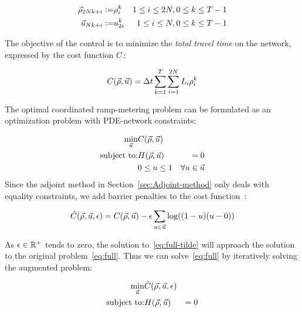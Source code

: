 							\begin{eqnarray*}
								\vec{\rho}_{2Nk+i}:= & \rho_{i}^{k} & 1\le i\le2N,0\le k\le T-1\\
								\vec{u}_{Nk+i}:= & u_{2i}^{k} & 1\le i\le N,0\le k\le T-1
							\end{eqnarray*}
														
														
							The objective of the control is to minimize the \emph{total travel
								time }on the network, expressed by the cost function $C$:
														
							\[
								\cost\left(\state,\control\right)=\Delta t\sum_{k=1}^{T}\sum_{i=1}^{2\nlinks}L_{i}\densitydiscrete{\link}{\tind}
							\]
														
														
							The optimal coordinated ramp-metering problem can be formulated as
							an optimization problem with PDE-network constraints:
														
							\begin{eqnarray}
								\min_{\control} & \cost\left(\state,\control\right)\label{eq:full}\\
								\text{subject to:} & \sys\left(\state,\control\right) & =0\nonumber \\
								& 0\le\convar\le1 & \forall\convar\in\control\nonumber 
							\end{eqnarray}
							Since the adjoint method in Section~\ref{sec:Adjoint-method} only
							deals with equality constraints, we add barrier penalties to the cost
							function~\cite{Boyd2010,Bayen2006}:
														
							\begin{equation}
								\tilde{\cost}\left(\state,\control,\epsilon\right)=\cost\left(\state,\control\right)-\barrierTerm\sum_{\convar\in\control}\log\left(\left(1-\convar\right)\left(\convar-0\right)\right)\label{eq:full-tilde}
							\end{equation}
														
														
							As $\epsilon\in\mathbb{R}^{+}$ tends to zero, the solution to~\eqref{eq:full-tilde}
							will approach the solution to the original problem~\eqref{eq:full}.
							Thus we can solve~\eqref{eq:full} by iteratively solving the augmented
							problem:
														
							\begin{eqnarray}
								\min_{\control} & \tilde{\cost}\left(\state,\control,\epsilon\right)\label{eq:full-1}\\
								\text{subject to:} & \sys\left(\state,\control\right) & =0\nonumber 
							\end{eqnarray}
														
